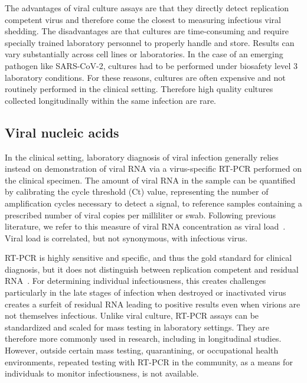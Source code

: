 \documentclass[12pt]{article}
\begin{document}
The advantages of viral culture assays are that they directly detect replication competent virus and therefore come the closest to measuring infectious viral shedding. The disadvantages are that cultures are time-consuming and require specially trained laboratory personnel to properly handle and store. Results can vary substantially across cell lines or laboratories. In the case of an emerging pathogen like SARS-CoV-2, cultures had to be performed under biosafety level 3 laboratory conditions. For these reasons, cultures are often expensive and not routinely performed in the clinical setting. Therefore high quality cultures collected longitudinally within the same infection are rare.

\subsection{Viral nucleic acids}
In the clinical setting, laboratory diagnosis of viral infection generally relies instead on demonstration of viral RNA via a virus-specific RT-PCR performed on the clinical specimen. The amount of viral RNA in the sample can be quantified by calibrating the cycle threshold (Ct) value, representing the number of amplification cycles necessary to detect a signal, to reference samples containing a prescribed number of viral copies per milliliter or swab. Following previous literature, we refer to this measure of viral RNA concentration as viral load~\cite{puhach2022infectious}. Viral load is correlated, but not synonymous, with infectious virus.

RT-PCR is highly sensitive and specific, and thus the gold standard for clinical diagnosis, but it does not distinguish between replication competent and residual RNA~\cite{binnicker2020challenges}. For determining individual infectiousness, this creates challenges particularly in the late stages of infection when destroyed or inactivated virus creates a surfeit of residual RNA leading to positive results even when virions are not themselves infectious. Unlike viral culture, RT-PCR assays can be standardized and scaled for mass testing in laboratory settings. They are therefore more commonly used in research, including in longitudinal studies. However, outside certain mass testing, quarantining, or occupational health environments, repeated testing with RT-PCR in the community, as a means for individuals to monitor infectiousness, is not available.
\end{document}
